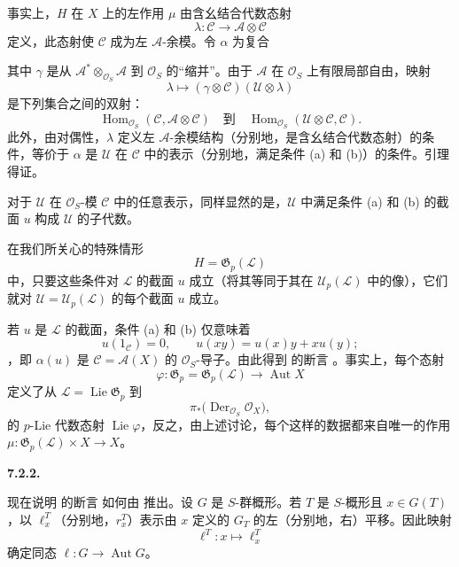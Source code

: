 事实上，\(H\) 在 \(X\) 上的左作用 \(\mu\) 由含幺结合代数态射
\[
  \lambda:\mathcal C\longrightarrow\mathcal A\otimes\mathcal C
\]
定义，此态射使 \(\mathcal C\) 成为左 \(\mathcal A\)-余模。令 \(\alpha\) 为复合
\begin{center}
  \label{sga3:VIIA:7.2.1-action-contraction-composite}
  
\end{center}
其中 \(\gamma\) 是从 \(\mathcal A^{*}\otimes_{\mathcal O_S}\mathcal A\) 到 \(\mathcal O_S\) 的“缩并”。由于 \(\mathcal A\) 在 \(\mathcal O_S\) 上有限局部自由，映射
\[
  \lambda
  \longmapsto
  (\gamma\otimes\mathcal C)(\mathcal U\otimes\lambda)
\]
是下列集合之间的双射：
\[
  \operatorname{Hom}_{\mathcal O_S}
    (\mathcal C,\mathcal A\otimes\mathcal C)
  \quad\text{到}\quad
  \operatorname{Hom}_{\mathcal O_S}
    (\mathcal U\otimes\mathcal C,\mathcal C).
\]
此外，由对偶性，\(\lambda\) 定义左 \(\mathcal A\)-余模结构（分别地，是含幺结合代数态射）的条件，等价于 \(\alpha\) 是 \(\mathcal U\) 在 \(\mathcal C\) 中的表示（分别地，满足条件 (a) 和 (b)）的条件。引理得证。

对于 \(\mathcal U\) 在 \(\mathcal O_S\)-模 \(\mathcal C\) 中的任意表示，同样显然的是，\(\mathcal U\) 中满足条件 (a) 和 (b) 的截面 \(u\) 构成 \(\mathcal U\) 的子代数。

在我们所关心的特殊情形
\[
  H=\mathfrak G_p(\mathcal L)
\]
中，只要这些条件对 \(\mathcal L\) 的截面 \(u\) 成立（将其等同于其在 \(\mathcal U_p(\mathcal L)\) 中的像），它们就对 \(\mathcal U=\mathcal U_p(\mathcal L)\) 的每个截面 \(u\) 成立。

若 \(u\) 是 \(\mathcal L\) 的截面，条件 (a) 和 (b) 仅意味着
\[
  u(1_{\mathcal C})=0,
  \qquad
  u(xy)=u(x)y+xu(y);
\]
，即 \(\alpha(u)\) 是 \(\mathcal C=\mathcal A(X)\) 的 \(\mathcal O_S\)-导子。由此得到  的断言 。事实上，每个态射
\[
  \varphi:\mathfrak G_p=\mathfrak G_p(\mathcal L)
  \longrightarrow\operatorname{Aut}X
\]
定义了从 \(\mathcal L=\operatorname{Lie}\mathfrak G_p\) 到
\[
  \pi_*
  \bigl(
    \operatorname{Der}_{\mathcal O_S}\mathcal O_X
  \bigr),
\]
的 \(p\)-Lie 代数态射 \(\operatorname{Lie}\varphi\)，反之，由上述讨论，每个这样的数据都来自唯一的作用 \(\mu:\mathfrak G_p(\mathcal L)\times X\to X\)。

\medskip
\noindent\textbf{7.2.2.}
\label{sga3:VIIA:7.2.2}

现在说明  的断言  如何由  推出。设 \(G\) 是 \(S\)-群概形。若 \(T\) 是 \(S\)-概形且 \(x\in G(T)\)，以 \(\ell_x^T\)（分别地，\(r_x^T\)）表示由 \(x\) 定义的 \(G_T\) 的左（分别地，右）平移。因此映射
\[
  \ell^T:x\longmapsto\ell_x^T
\]
确定同态 \(\ell:G\to\operatorname{Aut}G\)。

